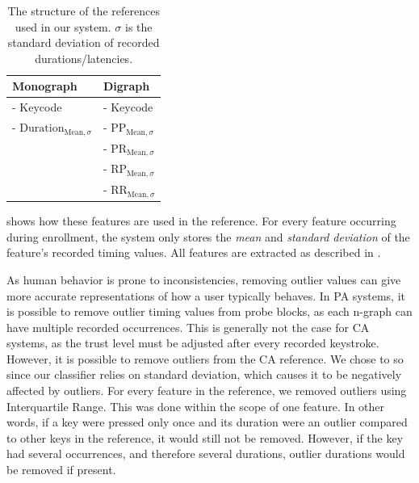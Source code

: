 \begin{table}[h]
\centering
\begin{tabular}{|l|l|}
\hline
Monograph & Digraph\\ \hline
- Keycode & - Keycode\\
- $\text{Duration}_{\text{Mean}, \sigma} $& - $\text{PP}_{\text{Mean}, \sigma}$\\
& - $\text{PR}_{\text{Mean}, \sigma}$  \\
& - $\text{RP}_{\text{Mean}, \sigma}$ \\
& - $\text{RR}_{\text{Mean}, \sigma}$
\\ \hline
\end{tabular}

\caption{The structure of the references used in our system. $\sigma$ is the standard deviation of recorded durations/latencies.}
\label{tab:reference-structure}
\end{table}
 shows how these features are used in the reference.
For every feature occurring during enrollment, the system only stores the \textit{mean} and \textit{standard deviation} of the feature's recorded timing values.
All features are extracted as described in .


As human behavior is prone to inconsistencies, removing outlier values can give more accurate representations of how a user typically behaves.
In PA systems, it is possible to remove outlier timing values from probe blocks, as each n-graph can have multiple recorded occurrences.
This is generally not the case for CA systems, as the trust level must be adjusted after every recorded keystroke.
However, it is possible to remove outliers from the CA reference.
We chose to so since our classifier relies on standard deviation, which causes it to be negatively affected by outliers.
For every feature in the reference, we removed outliers using Interquartile Range.
This was done within the scope of one feature. 
In other words, if a key were pressed only once and its duration were an outlier compared to other keys in the reference, it would still not be removed.
However, if the key had several occurrences, and therefore several durations, outlier durations would be removed if present.


